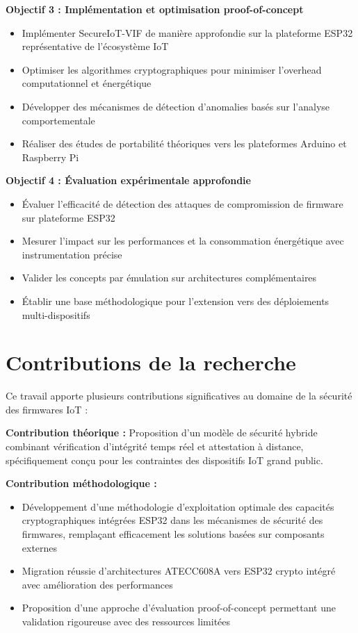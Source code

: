 \textbf{Objectif 3 : Implémentation et optimisation proof-of-concept}
\begin{itemize}
    \item Implémenter SecureIoT-VIF de manière approfondie sur la plateforme ESP32 représentative de l'écosystème IoT
    \item Optimiser les algorithmes cryptographiques pour minimiser l'overhead computationnel et énergétique
    \item Développer des mécanismes de détection d'anomalies basés sur l'analyse comportementale
    \item Réaliser des études de portabilité théoriques vers les plateformes Arduino et Raspberry Pi
\end{itemize}

\textbf{Objectif 4 : Évaluation expérimentale approfondie}
\begin{itemize}
    \item Évaluer l'efficacité de détection des attaques de compromission de firmware sur plateforme ESP32
    \item Mesurer l'impact sur les performances et la consommation énergétique avec instrumentation précise
    \item Valider les concepts par émulation sur architectures complémentaires
    \item Établir une base méthodologique pour l'extension vers des déploiements multi-dispositifs
\end{itemize}

\section{Contributions de la recherche}

Ce travail apporte plusieurs contributions significatives au domaine de la sécurité des firmwares IoT :

\textbf{Contribution théorique :} Proposition d'un modèle de sécurité hybride combinant vérification d'intégrité temps réel et attestation à distance, spécifiquement conçu pour les contraintes des dispositifs IoT grand public.

\textbf{Contribution méthodologique :} 
\begin{itemize}
    \item Développement d'une méthodologie d'exploitation optimale des capacités cryptographiques intégrées ESP32 dans les mécanismes de sécurité des firmwares, remplaçant efficacement les solutions basées sur composants externes
    \item Migration réussie d'architectures ATECC608A vers ESP32 crypto intégré avec amélioration des performances
    \item Proposition d'une approche d'évaluation proof-of-concept permettant une validation rigoureuse avec des ressources limitées
\end{itemize}

